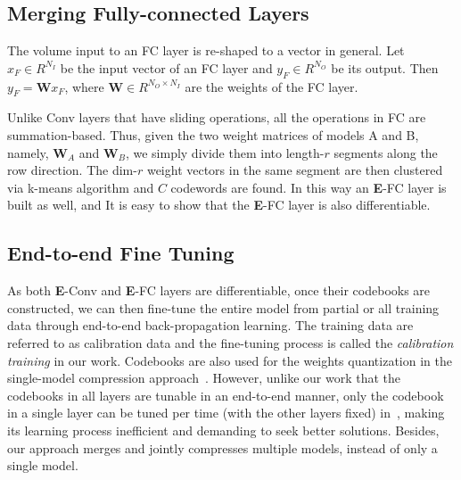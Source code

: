 \documentclass{article}
\begin{document}
	
	\subsection{Merging Fully-connected Layers}
	The volume input to an FC layer is re-shaped to a vector in general.
	Let $x_F \in R^{N_I}$ be the input vector of an FC layer and $y_F \in R^{N_O}$ be its output.
	Then $y_F=\mathbf{W}x_F$, where $\mathbf{W} \in R^{N_O\times N_I}$ are the weights of the FC layer.
	
	Unlike Conv layers that have sliding operations, all the operations in FC are summation-based.
	Thus, given the two weight matrices of models A and B, namely, $\mathbf{W}_A$ and $\mathbf{W}_B$, we simply divide them into length-$r$ segments along the row direction.
	The dim-$r$ weight vectors in the same segment are then clustered via k-means algorithm and $C$ codewords are found.
	In this way an \textbf{E}-FC layer is built as well, and
	It is easy to show that the \textbf{E}-FC layer is also differentiable. %
	
	\subsection{End-to-end Fine Tuning} %
	As both \textbf{E}-Conv and \textbf{E}-FC layers are differentiable, once their codebooks are constructed, we can then fine-tune the entire model from partial or all training data through end-to-end back-propagation learning.
	The training data are referred to as calibration data and the fine-tuning process is called the \emph{calibration training} in our work.
	Codebooks are also used for the weights quantization in the single-model compression approach~\cite{Wu16}.
	However, unlike our work that the codebooks in all layers are tunable in an end-to-end manner, only the codebook in a single layer can be tuned per time (with the other layers fixed) in~\cite{Wu16}, making its learning process inefficient and demanding to seek better solutions.
	Besides, our approach merges and jointly compresses multiple models, instead of only a single model.
	
\end{document}
